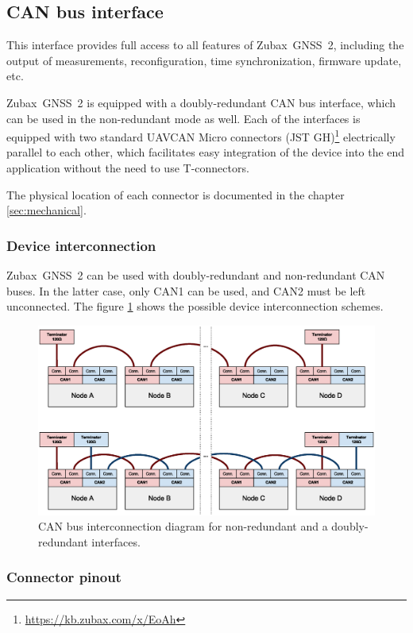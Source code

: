 \documentclass{zubaxdoc}
\begin{document}
\subsection{CAN bus interface}

This interface provides full access to all features of Zubax~GNSS~2, including the output of measurements,
reconfiguration, time synchronization, firmware update, etc.

Zubax~GNSS~2 is equipped with a doubly-redundant CAN bus interface, which can be used in the non-redundant mode
as well.
Each of the interfaces is equipped with two standard
UAVCAN Micro connectors (JST GH)\footnote{\url{https://kb.zubax.com/x/EoAh}}
electrically parallel to each other,
which facilitates easy integration of the device into the end application without the need to use T-connectors.

The physical location of each connector is documented in the chapter \ref{sec:mechanical}.

\subsubsection{Device interconnection}

Zubax~GNSS~2 can be used with doubly-redundant and non-redundant CAN buses.
In the latter case, only CAN1 can be used, and CAN2 must be left unconnected.
The figure \ref{can_daisy_chain} shows the possible device interconnection schemes.

\begin{figure}[hbt]
    \center
	\includegraphics[width=1\textwidth]{can_daisy_chain}
	\caption{CAN bus interconnection diagram for non-redundant and a doubly-redundant interfaces.
	\label{can_daisy_chain}}
\end{figure}

\subsubsection{Connector pinout}
\end{document}
